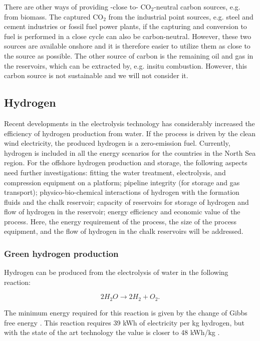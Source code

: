 \documentclass{ECOS_2021}
\begin{document}
There are other ways of providing -close to- CO$_{2}$-neutral carbon
sources, e.g. from biomass. The captured CO$_{2}$ from the industrial
point sources, e.g. steel and cement industries or fossil fuel power
plants, if the capturing and conversion to fuel is performed in a
close cycle can also be carbon-neutral. However, these two sources
are available onshore and it is therefore easier to utilize them as
close to the source as possible. The other source of carbon is the
remaining oil and gas in the reservoirs, which can be extracted by,
e.g. insitu combustion. However, this carbon source is not sustainable
and we will not consider it. 

\subsection{Hydrogen}

Recent developments in the electrolysis technology has considerably
increased the efficiency of hydrogen production from water. If the
process is driven by the clean wind electricity, the produced hydrogen
is a zero-emission fuel. Currently, hydrogen is included in all the
energy scenarios for the countries in the North Sea region. For the
offshore hydrogen production and storage, the following aspects need
further investigations: fitting the water treatment, electrolysis,
and compression equipment on a platform; pipeline integrity (for storage
and gas transport); physico-bio-chemical interactions of hydrogen
with the formation fluids and the chalk reservoir; capacity of reservoirs
for storage of hydrogen and flow of hydrogen in the reservoir; energy
efficiency and economic value of the process. Here, the energy requirement
of the process, the size of the process equipment, and the flow of
hydrogen in the chalk reservoirs will be addressed. 

\subsubsection{Green hydrogen production }

Hydrogen can be produced from the electrolysis of water in the following
reaction: 

\[
2H_{2}O\rightarrow2H_{2}+O_{2}.
\]

The minimum energy required for this reaction is given by the change
of Gibbs free energy \cite{rosenEnergyExergyAnalyses1995}. This reaction
requires 39 kWh of electricity per kg hydrogen, but with the state
of the art technology the value is closer to 48 kWh/kg \cite{gardnerHydrogenProductionRenewables2009,ozarslanLargescaleHydrogenEnergy2012}.
\end{document}
